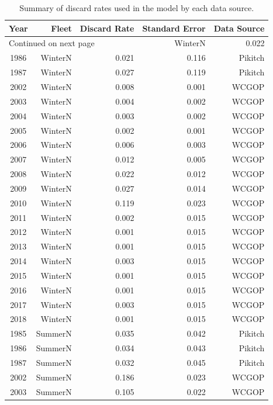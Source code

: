 \documentclass[12pt,]{article}
\begin{document}
\clearpage   \newpage

\begin{longtable}{crrrr}
\caption{Summary of discard rates used in the model by each data source.} \\ 
  \hline
Year & Fleet & Discard Rate & Standard Error & Data Source \\ 
  \hline 
\endhead 
\hline 
\multicolumn{3}{l}{\footnotesize Continued on next page} 
\endfoot 
\endlastfoot 
 \hline
1985 & WinterN & 0.022 & 0.110 & Pikitch \\ 
  1986 & WinterN & 0.021 & 0.116 & Pikitch \\ 
  1987 & WinterN & 0.027 & 0.119 & Pikitch \\ 
  2002 & WinterN & 0.008 & 0.001 & WCGOP \\ 
  2003 & WinterN & 0.004 & 0.002 & WCGOP \\ 
  2004 & WinterN & 0.003 & 0.002 & WCGOP \\ 
  2005 & WinterN & 0.002 & 0.001 & WCGOP \\ 
  2006 & WinterN & 0.006 & 0.003 & WCGOP \\ 
  2007 & WinterN & 0.012 & 0.005 & WCGOP \\ 
  2008 & WinterN & 0.022 & 0.012 & WCGOP \\ 
  2009 & WinterN & 0.027 & 0.014 & WCGOP \\ 
  2010 & WinterN & 0.119 & 0.023 & WCGOP \\ 
  2011 & WinterN & 0.002 & 0.015 & WCGOP \\ 
  2012 & WinterN & 0.001 & 0.015 & WCGOP \\ 
  2013 & WinterN & 0.001 & 0.015 & WCGOP \\ 
  2014 & WinterN & 0.003 & 0.015 & WCGOP \\ 
  2015 & WinterN & 0.001 & 0.015 & WCGOP \\ 
  2016 & WinterN & 0.001 & 0.015 & WCGOP \\ 
  2017 & WinterN & 0.003 & 0.015 & WCGOP \\ 
  2018 & WinterN & 0.001 & 0.015 & WCGOP \\ 
  1985 & SummerN & 0.035 & 0.042 & Pikitch \\ 
  1986 & SummerN & 0.034 & 0.043 & Pikitch \\ 
  1987 & SummerN & 0.032 & 0.045 & Pikitch \\ 
  2002 & SummerN & 0.186 & 0.023 & WCGOP \\ 
  2003 & SummerN & 0.105 & 0.022 & WCGOP \\ 

\end{longtable}
\end{document}
